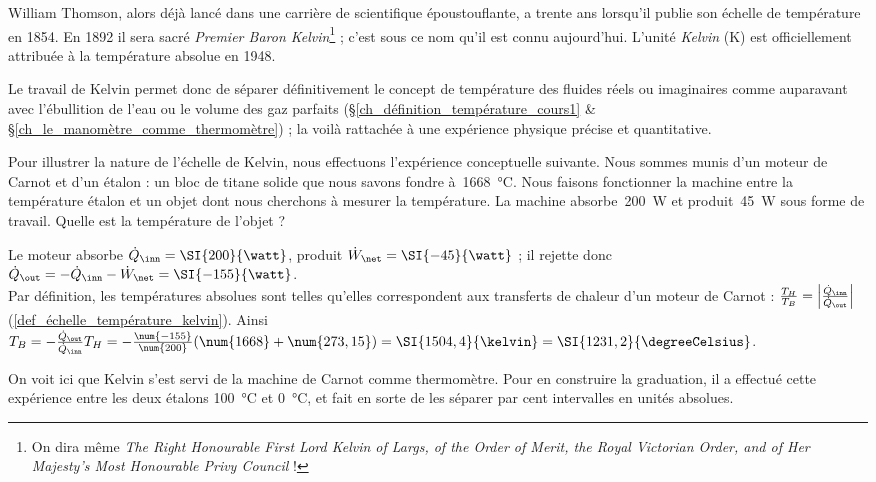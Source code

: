 		William Thomson, alors déjà lancé dans une carrière de scientifique époustouflante,  a trente ans lorsqu’il publie son échelle de température en 1854. En 1892 il sera sacré \textit{Premier Baron Kelvin}\footnote{On dira même \textit{The Right Honourable First Lord Kelvin of Largs, of the Order of Merit, the Royal Victorian Order, and of Her Majesty's Most Honourable Privy Council} !} ; c’est sous ce nom qu’il est connu aujourd’hui. L’unité \textit{Kelvin} (\si{\kelvin}) est officiellement attribuée à la température absolue en 1948. 
		
		Le travail de Kelvin permet donc de séparer définitivement le concept de température des fluides réels ou imaginaires comme auparavant avec l’ébullition de l’eau ou le volume des gaz parfaits (\S\ref{ch_définition_température_cours1} \& \S\ref{ch_le_manomètre_comme_thermomètre}) ; la voilà rattachée à une expérience physique précise et quantitative.

		\begin{anexample}
			Pour illustrer la nature de l’échelle de Kelvin, nous effectuons l’expérience conceptuelle suivante. Nous sommes munis d’un moteur de Carnot et d’un étalon : un bloc de titane solide que nous savons fondre à~\SI{1668}{\degreeCelsius}. Nous faisons fonctionner la machine entre la température étalon et un objet dont nous cherchons à mesurer la température. La machine absorbe~\SI{200}{\watt} et produit~\SI{45}{\watt} sous forme de travail. Quelle est la température de l’objet ?
				\begin{answer}
					Le moteur absorbe $\dot Q_\inn = \SI{200}{\watt}$, produit $\dot W_\net = \SI{-45}{\watt}$ ; il rejette donc $\dot Q_\out = - \dot Q_\inn - \dot W_\net = \SI{-155}{\watt}$. \\
					Par définition, les températures absolues sont telles qu’elles correspondent aux transferts de chaleur d’un moteur de Carnot : $\frac{T_H}{T_B} = \left|\frac{\dot Q_\inn}{\dot Q_\out}\right|$ (\ref{def_échelle_température_kelvin}). Ainsi $T_B = -\frac{\dot Q_\out}{\dot Q_\inn} T_H = -\frac{\num{-155}}{\num{200}} (\num{1668} + \num{273,15}) = \SI{1504,4}{\kelvin} = \SI{1231,2}{\degreeCelsius}$. 
				\end{answer}
					\begin{remark}On voit ici que Kelvin s’est servi de la machine de Carnot comme thermomètre. Pour en construire la graduation, il a effectué cette expérience entre les deux étalons \SI{100}{\degreeCelsius} et \SI{0}{\degreeCelsius}, et fait en sorte de les séparer par cent intervalles en unités absolues.\end{remark}
		\end{anexample}


